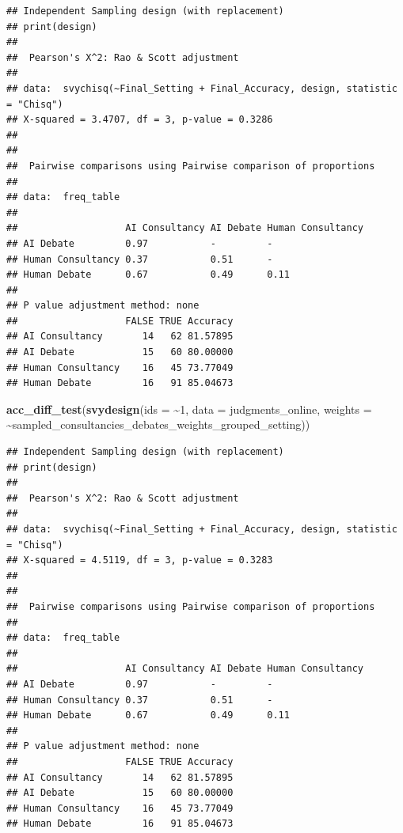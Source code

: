 \documentclass[
]{article}
\newenvironment{Shaded}{\begin{snugshade}}{\end{snugshade}}
\newcommand{\AttributeTok}[1]{\textcolor[rgb]{0.13,0.29,0.53}{#1}}
\newcommand{\DecValTok}[1]{\textcolor[rgb]{0.00,0.00,0.81}{#1}}
\newcommand{\FunctionTok}[1]{\textcolor[rgb]{0.13,0.29,0.53}{\textbf{#1}}}
\newcommand{\NormalTok}[1]{#1}
\newcommand{\SpecialCharTok}[1]{\textcolor[rgb]{0.81,0.36,0.00}{\textbf{#1}}}
\begin{document}
\begin{verbatim}
## Independent Sampling design (with replacement)
## print(design)
## 
##  Pearson's X^2: Rao & Scott adjustment
## 
## data:  svychisq(~Final_Setting + Final_Accuracy, design, statistic = "Chisq")
## X-squared = 3.4707, df = 3, p-value = 0.3286
## 
## 
##  Pairwise comparisons using Pairwise comparison of proportions 
## 
## data:  freq_table 
## 
##                   AI Consultancy AI Debate Human Consultancy
## AI Debate         0.97           -         -                
## Human Consultancy 0.37           0.51      -                
## Human Debate      0.67           0.49      0.11             
## 
## P value adjustment method: none 
##                   FALSE TRUE Accuracy
## AI Consultancy       14   62 81.57895
## AI Debate            15   60 80.00000
## Human Consultancy    16   45 73.77049
## Human Debate         16   91 85.04673
\end{verbatim}

\begin{Shaded}
\begin{Highlighting}[]
\FunctionTok{acc\_diff\_test}\NormalTok{(}\FunctionTok{svydesign}\NormalTok{(}\AttributeTok{ids =} \SpecialCharTok{\textasciitilde{}}\DecValTok{1}\NormalTok{, }\AttributeTok{data =}\NormalTok{ judgments\_online, }\AttributeTok{weights =} \SpecialCharTok{\textasciitilde{}}\NormalTok{sampled\_consultancies\_debates\_weights\_grouped\_setting))}
\end{Highlighting}
\end{Shaded}

\begin{verbatim}
## Independent Sampling design (with replacement)
## print(design)
## 
##  Pearson's X^2: Rao & Scott adjustment
## 
## data:  svychisq(~Final_Setting + Final_Accuracy, design, statistic = "Chisq")
## X-squared = 4.5119, df = 3, p-value = 0.3283
## 
## 
##  Pairwise comparisons using Pairwise comparison of proportions 
## 
## data:  freq_table 
## 
##                   AI Consultancy AI Debate Human Consultancy
## AI Debate         0.97           -         -                
## Human Consultancy 0.37           0.51      -                
## Human Debate      0.67           0.49      0.11             
## 
## P value adjustment method: none 
##                   FALSE TRUE Accuracy
## AI Consultancy       14   62 81.57895
## AI Debate            15   60 80.00000
## Human Consultancy    16   45 73.77049
## Human Debate         16   91 85.04673
\end{verbatim}
\end{document}
